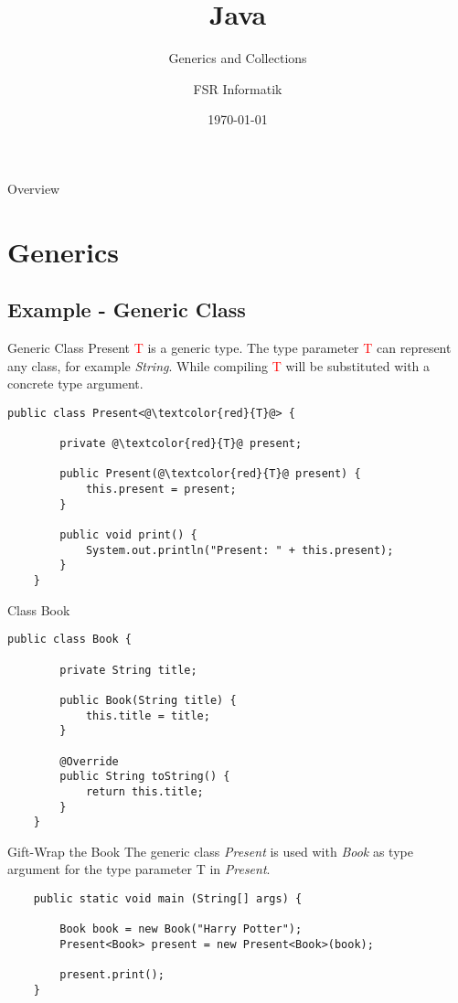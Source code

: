 

\title{Java}
\subtitle{Generics and Collections}
\author{FSR Informatik}
\date{\today}



\begin{frame}
\titlepage
\end{frame}
\begin{frame}{Overview}
\tableofcontents
\end{frame}

\section{Generics}
\subsection{Example - Generic Class}
\begin{frame}[fragile]{Generic Class Present}
	\textcolor{red}{T} is a generic type. 
	The type parameter \textcolor{red}{T} can represent any class, for example \emph{String}.
	While compiling \textcolor{red}{T} will be substituted with a concrete type argument.
	\begin{lstlisting}[basicstyle=\ttfamily\scriptsize]
	public class Present<@\textcolor{red}{T}@> {
	    
	    private @\textcolor{red}{T}@ present;
	    
	    public Present(@\textcolor{red}{T}@ present) {
	        this.present = present;
	    }
	    
	    public void print() {
	        System.out.println("Present: " + this.present);
	    }
	}
	\end{lstlisting}	
\end{frame}

\begin{frame}[fragile]{Class Book}
	\begin{lstlisting}[escapechar=!]
	public class Book {
	    
	    private String title;
	    
	    public Book(String title) {
	        this.title = title;
	    }
	    
	    @Override
	    public String toString() {
	        return this.title;
	    }
	}
	\end{lstlisting}	
\end{frame}

\begin{frame}[fragile]{Gift-Wrap the Book}
	The generic class \emph{Present} is used with \emph{Book} as type argument
	for the type parameter T in \emph{Present}.
	\vfill
	\begin{lstlisting}
	public static void main (String[] args) {
	    
	    Book book = new Book("Harry Potter");	    
	    Present<Book> present = new Present<Book>(book);
	    
	    present.print();
	}
	\end{lstlisting}
\end{frame}

